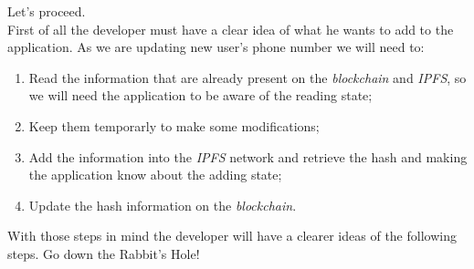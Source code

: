 Let's proceed.
\\First of all the developer must have a clear idea of what he wants to add to the application. As we are updating new user's phone number we will need to:
\begin{enumerate}
	\item Read the information that are already present on the \emph{blockchain} and \emph{IPFS}, so we will need the application to be aware of the reading state;
	\item Keep them temporarly to make some modifications;
	\item Add the information into the \emph{IPFS} network and retrieve the hash and making the application know about the adding state;
	\item Update the hash information on the \emph{blockchain}.
\end{enumerate}
With those steps in mind the developer will have a clearer ideas of the following steps.
Go down the Rabbit's Hole!

